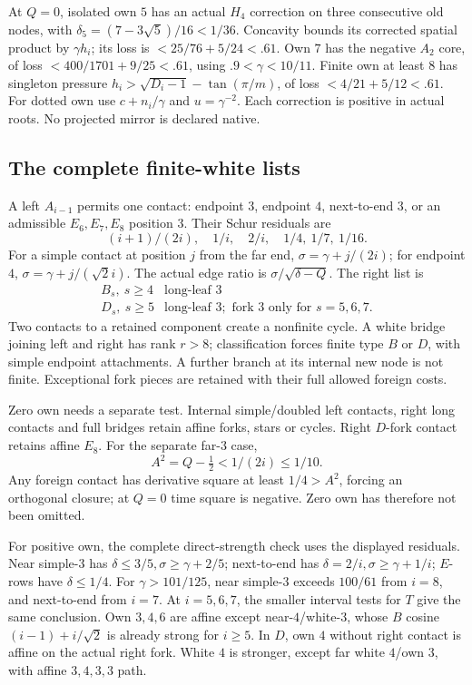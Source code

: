 \documentclass[11pt]{article}
\theoremstyle{definition}
\theoremstyle{remark}
\begin{document}
At \(Q=0\), isolated own \(5\) has an actual
\(H_4\) correction on three consecutive old nodes,
with \(\delta_5=(7-3\sqrt5)/16<1/36\).
Concavity bounds its corrected spatial product by
\(\gamma h_i\); its loss is \(<25/76+5/24<.61\).
Own \(7\) has the negative \(A_2\) core, of loss
\(<400/1701+9/25<.61\), using \(.9<\gamma<10/11\).
Finite own at least \(8\) has singleton pressure
\(h_i>\sqrt{D_i-1}-\tan(\pi/m)\), of loss
\(<4/21+5/12<.61\).
For dotted own use \(c+n_i/\gamma\) and \(u=\gamma^{-2}\).
Each correction is positive in actual roots.
No projected mirror is declared native.

\subsection{The complete finite-white lists}
A left \(A_{i-1}\) permits one contact: endpoint \(3\),
endpoint \(4\), next-to-end \(3\), or an admissible
\(E_6,E_7,E_8\) position \(3\).
Their Schur residuals are
\[
 (i+1)/(2i),\quad1/i,\quad2/i,\quad1/4,\ 1/7,\ 1/16.
\]
For a simple contact at position \(j\) from the far end,
\(\sigma=\gamma+j/(2i)\); for endpoint \(4\),
\(\sigma=\gamma+j/(\sqrt2i)\).
The actual edge ratio is \(\sigma/\sqrt{\delta-Q}\).
The right list is
\[
\begin{array}{c|l}
B_s,\ s\geq4&\text{long-leaf }3\\
D_s,\ s\geq5&\text{long-leaf }3;
 \text{ fork }3\text{ only for }s=5,6,7.
\end{array}
\]
Two contacts to a retained component create a nonfinite cycle.
A white bridge joining left and right has rank \(r>8\);
classification forces finite type \(B\) or \(D\), with simple
endpoint attachments. A further branch at its internal new
node is not finite. Exceptional fork pieces are retained
with their full allowed foreign costs.

Zero own needs a separate test. Internal simple/doubled left
contacts, right long contacts and full bridges retain affine
forks, stars or cycles. Right \(D\)-fork contact retains
affine \(E_8\). For the separate far-\(3\) case,
\[
 A^2=Q-\tfrac12<1/(2i)\leq1/10.
\]
Any foreign contact has derivative square at least \(1/4>A^2\),
forcing an orthogonal closure; at \(Q=0\) time square is
negative. Zero own has therefore not been omitted.

For positive own, the complete direct-strength check uses
the displayed residuals. Near simple-\(3\) has
\(\delta\leq3/5,\sigma\geq\gamma+2/5\);
next-to-end has \(\delta=2/i,\sigma\geq\gamma+1/i\);
\(E\)-rows have \(\delta\leq1/4\).
For \(\gamma>101/125\), near simple-\(3\) exceeds
\(100/61\) from \(i=8\), and next-to-end from \(i=7\).
At \(i=5,6,7\), the smaller interval tests for \(T\)
give the same conclusion. Own \(3,4,6\) are affine
except near-\(4\)/white-\(3\), whose \(B\) cosine
\((i-1)+i/\sqrt2\) is already strong for \(i\geq5\).
In \(D\), own \(4\) without right contact is affine on
the actual right fork. White \(4\) is stronger, except
far white \(4\)/own \(3\), with affine \(3,4,3,3\) path.
\end{document}
